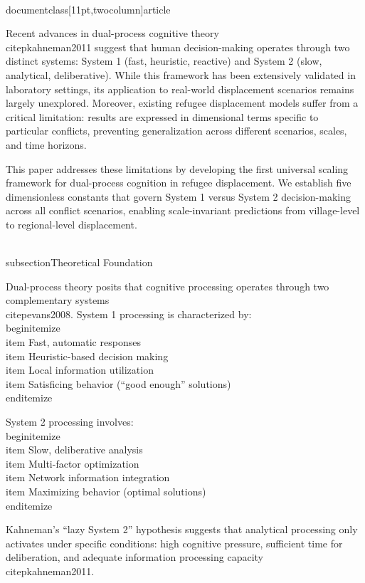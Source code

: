 \\documentclass[11pt,twocolumn]{article}
\begin{document}
Recent advances in dual-process cognitive theory \\citep{kahneman2011} suggest that human decision-making operates through two distinct systems: System 1 (fast, heuristic, reactive) and System 2 (slow, analytical, deliberative). While this framework has been extensively validated in laboratory settings, its application to real-world displacement scenarios remains largely unexplored. Moreover, existing refugee displacement models suffer from a critical limitation: results are expressed in dimensional terms specific to particular conflicts, preventing generalization across different scenarios, scales, and time horizons.

This paper addresses these limitations by developing the first universal scaling framework for dual-process cognition in refugee displacement. We establish five dimensionless constants that govern System 1 versus System 2 decision-making across all conflict scenarios, enabling scale-invariant predictions from village-level to regional-level displacement.

\\subsection{Theoretical Foundation}

Dual-process theory posits that cognitive processing operates through two complementary systems \\citep{evans2008}. System 1 processing is characterized by:
\\begin{itemize}
    \\item Fast, automatic responses
    \\item Heuristic-based decision making
    \\item Local information utilization
    \\item Satisficing behavior (``good enough'' solutions)
\\end{itemize}

System 2 processing involves:
\\begin{itemize}
    \\item Slow, deliberative analysis
    \\item Multi-factor optimization
    \\item Network information integration
    \\item Maximizing behavior (optimal solutions)
\\end{itemize}

Kahneman's ``lazy System 2'' hypothesis suggests that analytical processing only activates under specific conditions: high cognitive pressure, sufficient time for deliberation, and adequate information processing capacity \\citep{kahneman2011}.
\end{document}
